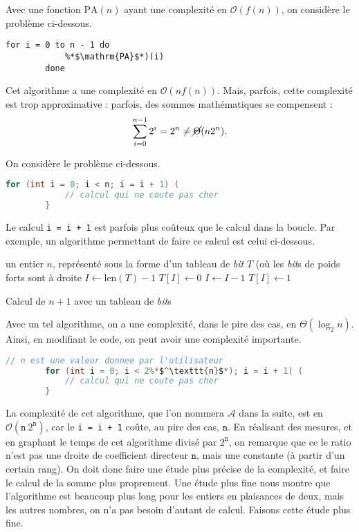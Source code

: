 \documentclass[a4paper]{article}
\begin{document}
	Avec une fonction $\mathrm{PA}(n)$\/ ayant une complexité en $\mathcal{O}(f(n))$, on considère le problème ci-dessous.
	\begin{lstlisting}[language=caml]
		for i = 0 to n - 1 do
			%*$\mathrm{PA}$*)(i)
		done
	\end{lstlisting}
	Cet algorithme a une complexité en $\mathcal{O}(n f(n))$. Mais, parfois, cette complexité est trop approximative : parfois, des sommes mathématiques se compensent : \[
		\sum_{i=0}^{n-1} 2^i = 2^n \neq \cancel{\Theta}(n 2^n)
	.\]

	On considère le problème ci-dessous.
	\begin{lstlisting}[language=c]
		for (int i = 0; i < n; i = i + 1) (
			// calcul qui ne coute pas cher
		}
	\end{lstlisting}
	Le calcul \texttt{i = i + 1} est parfois plus coûteux que le calcul dans la boucle.
	Par exemple, un algorithme permettant de faire ce calcul est celui ci-dessous.
	\begin{algorithm}[H]
		\centering
		\begin{algorithmic}[1]
			\Entree un entier $n$, représenté sous la forme d'un tableau de \textit{bit} $T$\/ (où les \textit{bit}s de poids forts sont à droite
			\State $I \gets \mathrm{len}(T) - 1$\/ 
			\State $T[I] \gets 0$
			\State $I \gets I - 1$
			\EndWhile
			\State $T[I] \gets 1$
		\end{algorithmic}
		\caption{Calcul de $n + 1$\/ avec un tableau de \textit{bit}s}
	\end{algorithm}
	Avec un tel algorithme, on a une complexité, dans le pire des cas, en $\Theta(\log_2 n)$.
	Ainsi, en modifiant le code, on peut avoir une complexité importante.
	\begin{lstlisting}[language=c]
		// n est une valeur donnee par l'utilisateur
		for (int i = 0; i < 2%*$^\texttt{n}$*); i = i + 1) (
			// calcul qui ne coute pas cher
		}
	\end{lstlisting}
	La complexité de cet algorithme, que l'on nommera $\mathcal{A}$\/ dans la suite,  est en $\mathcal{O}(\texttt{n}\:2^\texttt{n})$, car le \texttt{i = i + 1} coûte, au pire des cas, $\texttt{n}$.
	En réalisant des mesures, et en graphant le temps de cet algorithme divisé par $2^\texttt{n}$, on remarque que ce le ratio n'est pas une droite de coefficient directeur $\texttt{n}$, mais une constante (à partir d'un certain rang).
	On doit donc faire une étude plus précise de la complexité, et faire le calcul de la somme plus proprement.
	Une étude plus fine nous montre que l'algorithme est beaucoup plus long pour les entiers en plaisances de deux, mais les autres nombres, on n'a pas besoin d'autant de calcul.
	Faisons cette étude plus fine.
\end{document}
